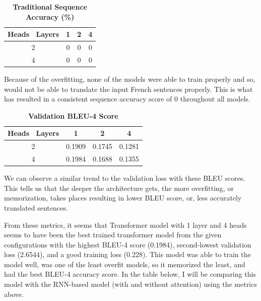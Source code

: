 \documentclass[a4paper]{article}
\begin{document}
\begin{table}[H]
    \centering
    \caption{\textbf{Traditional Sequence Accuracy (\%)}}
    \label{tab:seqAccp3}
    \begin{tabular}{| c || c | c | c |}
        \hline
        Heads \ Layers & 1 & 2 & 4 \\
        \hline
        2 & 0 & 0 & 0 \\
        \hline
        4 & 0 & 0 & 0 \\
        \hline
    \end{tabular}
\end{table}

Because of the overfitting, none of the models were able to train properly and so, would not be able to translate the input French sentences properly. This is what has resulted in a consistent sequence accuracy score of 0 throughout all models.

\begin{table}[H]
    \centering
    \caption{\textbf{Validation BLEU-4 Score}}
    \label{tab:valBLEUp3}
    \begin{tabular}{| c || c | c | c |}
        \hline
        Heads \ Layers & 1 & 2 & 4 \\
        \hline
        2 & 0.1909 & 0.1745 & 0.1281 \\
        \hline
        4 & 0.1984 & 0.1688 & 0.1355 \\
        \hline
    \end{tabular}
\end{table}

We can observe a similar trend to the validation loss with these BLEU scores. This tells us that the deeper the architecture gets, the more overfitting, or memorization, takes places resulting in lower BLEU score, or, less accurately translated sentences.

From these metrics, it seems that Transformer model with 1 layer and 4 heads seems to have been the best trained transformer model from the given configurations with the highest BLEU-4 score (0.1984), second-lowest  validation loss (2.6544), and a good training loss (0.228). This model was able to train the model well, was one of the least overfit models, so it memorized the least, and had the best BLEU-4 accuracy score. In the table below, I will be comparing this model with the RNN-based model (with and without attention) using the metrics above.
\end{document}

